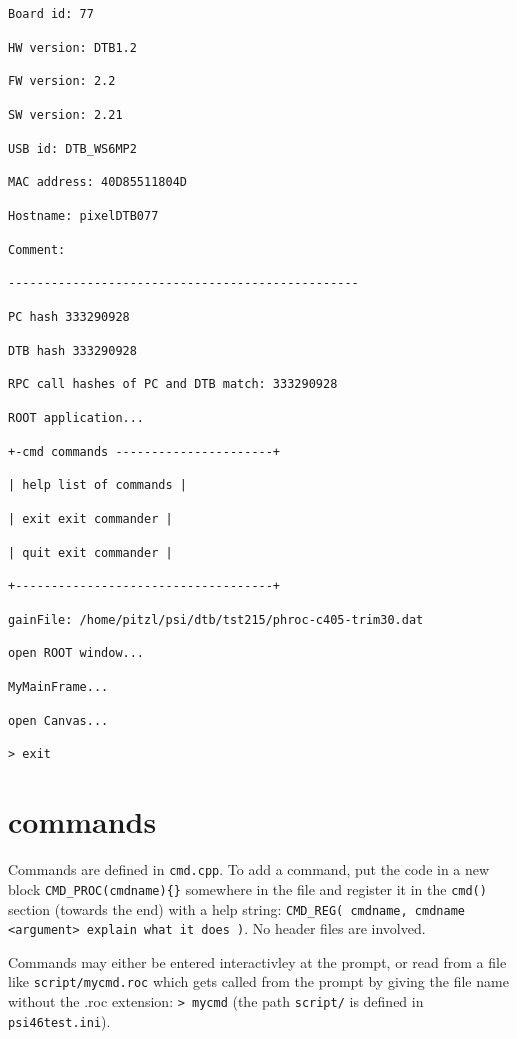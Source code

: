 \documentclass[english]{article}
\begin{document}
\texttt{Board id: 77}

\texttt{HW version: DTB1.2}

\texttt{FW version: 2.2}

\texttt{SW version: 2.21}

\texttt{USB id: DTB\_WS6MP2}

\texttt{MAC address: 40D85511804D}

\texttt{Hostname: pixelDTB077}

\texttt{Comment:}

\texttt{-{}-{}-{}-{}-{}-{}-{}-{}-{}-{}-{}-{}-{}-{}-{}-{}-{}-{}-{}-{}-{}-{}-{}-{}-{}-{}-{}-{}-{}-{}-{}-{}-{}-{}-{}-{}-{}-{}-{}-{}-{}-{}-{}-{}-{}-{}-{}-{}-}

\texttt{PC hash 333290928}

\texttt{DTB hash 333290928}

\texttt{RPC call hashes of PC and DTB match: 333290928}

\texttt{ROOT application...}

\texttt{+-cmd commands -{}-{}-{}-{}-{}-{}-{}-{}-{}-{}-{}-{}-{}-{}-{}-{}-{}-{}-{}-{}-{}-+}

\texttt{| help list of commands |}

\texttt{| exit exit commander |}

\texttt{| quit exit commander |}

\texttt{+-{}-{}-{}-{}-{}-{}-{}-{}-{}-{}-{}-{}-{}-{}-{}-{}-{}-{}-{}-{}-{}-{}-{}-{}-{}-{}-{}-{}-{}-{}-{}-{}-{}-{}-{}-+}

\texttt{gainFile: /home/pitzl/psi/dtb/tst215/phroc-c405-trim30.dat}

\texttt{open ROOT window...}

\texttt{MyMainFrame...}

\texttt{open Canvas... }

\texttt{> exit}


\section{commands}

Commands are defined in \texttt{cmd.cpp}. To add a command, put the
code in a new block \texttt{CMD\_PROC(cmdname)\{\}} somewhere in the
file and register it in the \texttt{cmd()} section (towards the end)
with a help string: \texttt{CMD\_REG( cmdname, \textquotedbl{}cmdname
<argument> explain what it does\textquotedbl{} )}. No header files
are involved.

Commands may either be entered interactivley at the prompt, or read
from a file like \texttt{script/mycmd.roc} which gets called from
the prompt by giving the file name without the .roc extension: \texttt{>
mycmd} (the path \texttt{script/} is defined in \texttt{psi46test.ini}).
\end{document}
